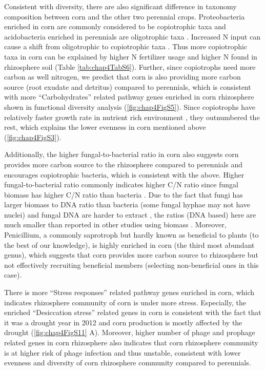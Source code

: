 \documentclass[]{msu-thesis}
\begin{document}
Consistent with diversity, there are also significant difference in taxonomy composition between corn and the other two perennial crops. Proteobacteria enriched in corn are commonly considered to be copiotrophic taxa and acidobacteria enriched in perennials are oligotrophic taxa \cite{fierer_toward_2007,eilers_shifts_2010}. Increased N input can cause a shift from oligotrophic to copiotrophic taxa \cite{fierer_comparative_2012,wessen_differential_2010}. Thus more copiotrophic taxa in corn can be explained by higher N fertilizer usage and higher N found in rhizosphere soil (Table \ref{tab:chap4TabS6}). Further, since copiotrophs need more carbon as well nitrogen, we predict that corn is also providing more carbon source (root exudate and detritus) compared to perennials, which is consistent with more ``Carbohydrates'' related pathway genes enriched in corn rhizosphere shown in functional diversity analysis (\cref{fig:chap4FigS5}). Since copiotrophs have relatively faster growth rate in nutrient rich environment \cite{fierer_comparative_2012}, they outnumbered the rest, which explains the lower evenness in corn mentioned above (\cref{fig:chap4FigS3}).

Additionally, the higher fungal-to-bacterial ratio in corn also suggests corn provides more carbon source to the rhizosphere compared to perennials and encourages copiotrophic bacteria, which is consistent with the above. Higher fungal-to-bacterial ratio commonly indicates higher C/N ratio since fungal biomass has higher C/N ratio than bacteria \cite{de_vries_fungal/bacterial_2006,waring_differences_2013}. Due to the fact that fungi has larger biomass to DNA ratio than bacteria (some fungal hyphae may not have nuclei) and fungal DNA are harder to extract \cite{muller_rapid_1998}, the ratios (DNA based) here are much smaller than reported in other studies using biomass \cite{jesus_influence_2015}. Moreover, Penicillium, a commonly saprotroph but hardly known as beneficial to plants (to the best of our knowledge), is highly enriched in corn (the third most abundant genus), which suggests that corn provides more carbon source to rhizosphere but not effectively recruiting beneficial members (selecting non-beneficial ones in this case).

There is more ``Stress responses'' related pathway genes enriched in corn, which indicates rhizosphere community of corn is under more stress. Especially, the enriched ``Desiccation stress'' related genes in corn is consistent with the fact that it was a drought year in 2012 and corn production is mostly affected by the drought (\cref{fig:chap4FigS11} A). Moreover, higher number of phage and prophage related genes in corn rhizosphere also indicates that corn rhizosphere community is at higher risk of phage infection and thus unstable, consistent with lower evenness and diversity of corn rhizosphere community compared to perennials.
\end{document}
